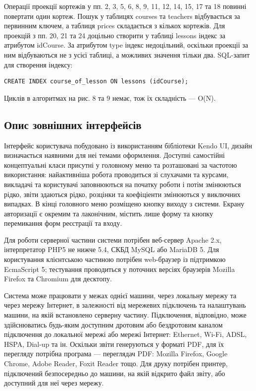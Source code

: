 Операції проекції кортежів у пп. 2, 3, 5, 6, 8, 9, 11, 12, 14, 15, 17 та 18 повинні повертати один кортеж. Пошук у таблицях courses та teachers відбувається за первинним ключем, а таблиця prices складається з кількох кортежів. Для проекцій з пп. 20, 21 та 24 доцільно створити у таблиці lessons індекс за атрибутом idCourse. За атрибутом type індекс недоцільний, оскільки проекції за ним відбуваються не з усієї таблиці, а можливих значення тільки два. SQL-запит для створення індексу:
\begin{verbatim}
CREATE INDEX course_of_lesson ON lessons (idCourse);
\end{verbatim}

Циклів в алгоритмах на рис. 8 та 9 немає, тож їх складність --- O(N).

\subsection{Опис зовнішних інтерфейсів}

Інтерфейс користувача побудовано із використанням бібліотеки Kendo UI, дизайн визначається наявними для неі темами оформлення. Доступні самостійні концептуальні класи присутні у головному меню та розташовані за частотою використання: найактивніша робота проводиться зі слухачами та курсами, викладачі та користувачі заповнюються на початку роботи і потім змінюються рідко, звіти здаються рідко, розцінки та коефіціенти змінюються у виключних випадках. В кінці головного меню розміщено кнопку виходу з системи. Екрану авторизації є окремим та лаконічним, містить лише форму та кнопку перемикання форм реєстрації та входу.

Для роботи серверної частини системи потрібен веб-сервер Apache 2.x, інтерпретатор PHP5 не нижче 5.4, СКБД MySQL або MariaDB 5. Для користування клієнтською частиною потрібен web-браузер із підтримкою EcmaScript 5; тестування проводиться у поточних версіях браузерів Mozilla Firefox та Chromium для десктопу.

Система може працювати у межах однієї машини, через локальну мережу та через мережу Інтернет, в залежності від мережевих підключень та налаштувань машини, на якій встановлено серверну частину. Підключення, відповідно, може здійснюватись будь-яким доступним дротовим або бездротовим каналом підключення до локальної мережі або мережі Інтернет: Ethernet, Wi-Fi, ADSL, HSPA, Dial-up та ін. Оскільки звіти генеруються у форматі PDF, для їх перегляду потрібна програма --- переглядач PDF: Mozilla Firefox, Google Chrome, Adobe Reader, Foxit Reader тощо. Для друку потрібен принтер, підключений безпосередньо до машини, на якій відкрито файл звіту, або доступний для неї через мережу.

